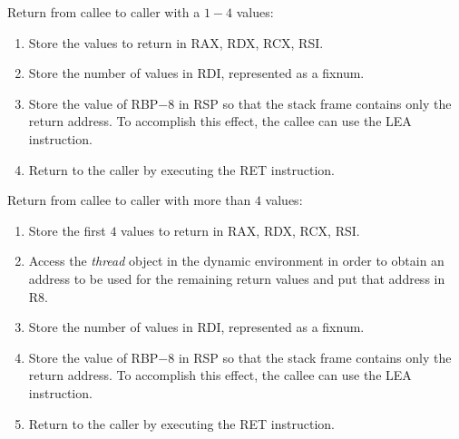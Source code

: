 Return from callee to caller with a $1 - 4$ values:

\begin{enumerate}
\item Store the values to return in RAX, RDX, RCX, RSI.
\item Store the number of values in RDI, represented as a fixnum.
\item Store the value of RBP$ - 8$ in RSP so that the stack frame
  contains only the return address.  To accomplish this effect, the
  callee can use the LEA instruction.
\item Return to the caller by executing the RET instruction.
\end{enumerate}

Return from callee to caller with more than $4$ values:

\begin{enumerate}
\item Store the first $4$ values to return in RAX, RDX, RCX, RSI.
\item Access the \emph{thread} object in the dynamic environment in
  order to obtain an address to be used for the remaining return
  values and put that address in R8.
\item Store the number of values in RDI, represented as a fixnum.
\item Store the value of RBP$ - 8$ in RSP so that the stack frame
  contains only the return address.  To accomplish this effect, the
  callee can use the LEA instruction.
\item Return to the caller by executing the RET instruction.
\end{enumerate}
